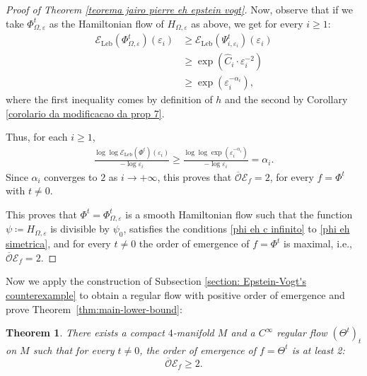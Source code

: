 \documentclass[11pt,reqno]{amsart}
\theoremstyle{plain}
\newtheorem{thm}[theorem]{Theorem}
\theoremstyle{definition}
\theoremstyle{remark}
\theoremstyle{plain}
\numberwithin{equation}{section}
\newcommand{\eps}{\varepsilon}
\begin{document}
\begin{proof}[Proof of Theorem \ref{teorema jairo pierre eh epstein vogt}]
		
		
		Now, observe that if we take $\Phi^{t}_{\Omega,\eps}$ as the Hamiltonian flow of $H_{\Omega,\eps}$ as above, we get for every $i\geq 1$: \begin{align*}
			\mathcal{E}_{\mathrm{Leb}}(\Phi^{t}_{\Omega,\eps})(\eps_{i})&\geq \mathcal{E}_{\mathrm{Leb}}(\Psi^{t}_{i,\eps_{i}})(\eps_{i})
			\\ &\geq \exp(\widehat{C}_{i}\cdot \eps_{i}^{-2})
			\\&\geq \exp (\eps_{i}^{-\alpha_{i}}),
		\end{align*} where the first inequality comes by definition of $h$ and the second by Corollary \ref{corolario da modificacao da prop 7}.
		
		Thus, for each $i\geq 1$, \begin{align*}
			\frac{\log{\log{\mathcal{E}_{\mathrm{Leb}}(\Phi^{t})(\eps_{i})}}}{-\log{\eps_{i}}}%
			\geq \frac{\log{\log{\exp(\eps_{i}^{-\alpha_{i}})}}}{-\log{\eps_{i}}}=\alpha_{i}.
		\end{align*} Since $\alpha_{i}$ converges to $2$ as $i\to +\infty$, this proves that $\overline{\mathcal{O}}\mathcal{E}_{f}=2$, for every $f=\Phi^{t}$ with $t\neq 0$.
		
		
		
		This proves that $\Phi^{t}=\Phi^{t}_{\Omega,\eps}$ is a smooth Hamiltonian flow such that the function $\psi\coloneqq H_{\Omega,\eps}$ is divisible by $\psi_{0}$, satisfies the conditions \ref{phi eh c infinito} to \ref{phi eh simetrica}, and for every $t\neq 0$ the order of emergence of $f=\Phi^{t}$ is maximal, i.e., $\overline{\mathcal{O}}\mathcal{E}_{f}=2$.
	\end{proof}
				
				
				
Now we apply the construction of Subsection \ref{section: Epstein-Vogt's counterexample} to obtain a regular flow with positive order of emergence and prove Theorem~\ref{thm:main-lower-bound}:
					
					\begin{thm} \label{epstein vogt com emergencia}
						There exists a compact $4$-manifold $M$ and a $C^{\infty}$ regular flow $(\Theta^{t})_{t}$ on $M$ such that for every $t\neq 0$, the order of emergence of $f=\Theta^{t}$ is at least 2: $$\overline{\mathcal{O}}\mathcal{E}_{f}\geq 2.$$
					\end{thm}
					
\end{document}
